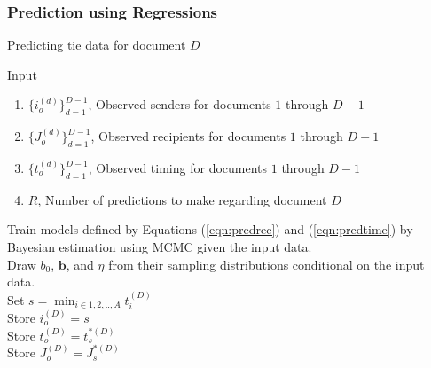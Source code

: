               \subsubsection{Prediction using Regressions} \label{subsubsec: Regression PPE}
       \begin{algorithm}[H]
       	\SetAlgoLined
       	\caption{Predicting tie data for document $D$}
       	Input
       	\begin{enumerate}
       		\item $\{i_o^{(d)}\}_{d=1}^{D-1}$, Observed senders for documents $1$ through $D-1$ 
       		\item $\{J_o^{(d)}\}_{d=1}^{D-1}$, Observed recipients for documents $1$ through $D-1$ 
       		\item $\{t_o^{(d)}\}_{d=1}^{D-1}$, Observed timing for documents $1$ through $D-1$
       		\item $R$, Number of predictions to make regarding document $D$
       	\end{enumerate}
       	Train models defined by Equations (\ref{eqn:predrec}) and (\ref{eqn:predtime}) by Bayesian estimation using MCMC given the input data. \\
       	 {
       		Draw $b_0$, $\boldsymbol{b}$, and $\eta$ from their sampling distributions conditional on the input data.\\ 
       		Set  $s = \displaystyle{\min_{i \in 1,2,..,A} } t_i^{(D)}$ \\
       		Store $i_o^{(D)} = s$ \\
       		Store $t_o^{(D)}= t_s^{*(D)}$ \\
       		Store $J_o^{(D)}= J_s^{*(D)}$ \\
       	}
       	\label{alg:docpredict}
       \end{algorithm}

